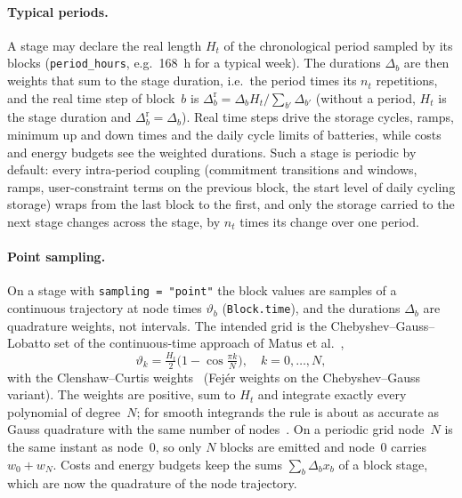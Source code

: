 \paragraph{Typical periods.}
A stage may declare the real length $H_t$ of the chronological period
sampled by its blocks (\texttt{period\_hours}, e.g.\ 168~h for a
typical week).  The durations $\Delta_b$ are then weights that sum to
the stage duration, i.e.\ the period times its $n_t$ repetitions, and
the real time step of block~$b$ is
$\Delta^\text{r}_b = \Delta_b H_t / \sum_{b'} \Delta_{b'}$ (without a
period, $H_t$ is the stage duration and $\Delta^\text{r}_b =
\Delta_b$).  Real time
steps drive the storage cycles, ramps, minimum up and down times and
the daily cycle limits of batteries, while costs and energy budgets see
the weighted durations.  Such a stage is periodic by default: every
intra-period coupling (commitment transitions and windows, ramps,
user-constraint terms on the previous block, the start level of daily
cycling storage) wraps from the last block to the first, and only the
storage carried to the next stage changes across the stage, by $n_t$
times its change over one period.

\paragraph{Point sampling.}
On a stage with \texttt{sampling = "point"} the block values are
samples of a continuous trajectory at node times $\vartheta_b$
(\texttt{Block.time}), and the durations $\Delta_b$ are quadrature
weights, not intervals.  The intended grid is the
Chebyshev--Gauss--Lobatto set of the continuous-time approach of Matus
et al.~\cite{matus2015chebyshev},
\begin{equation}
\label{eq:cheb_nodes}
\vartheta_k = \tfrac{H_t}{2}\bigl(1 - \cos\tfrac{\pi k}{N}\bigr),
\quad k = 0, \dots, N,
\end{equation}
with the Clenshaw--Curtis weights~\cite{clenshaw1960,
waldvogel2006fejer} (Fej\'er weights on the Chebyshev--Gauss
variant).  The weights are positive, sum to $H_t$ and integrate exactly
every polynomial of degree~$N$; for smooth integrands the rule is about
as accurate as Gauss quadrature with the same number of
nodes~\cite{trefethen2008gauss}.  On a periodic grid node~$N$ is the
same instant as node~0, so only $N$ blocks are emitted and node~0
carries $w_0 + w_N$.  Costs and energy budgets keep the sums
$\sum_b \Delta_b x_b$ of a block stage, which are now the quadrature of
the node trajectory.

